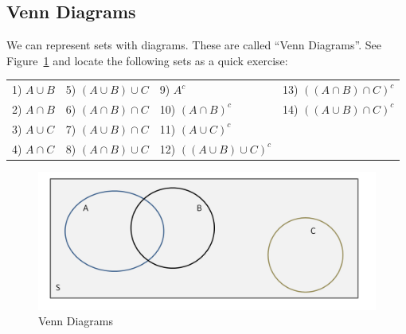 \documentclass[11pt]{article}
\begin{document}
\subsection*{Venn Diagrams}
 We can represent sets with diagrams. These are called ``Venn Diagrams''. See Figure~\ref{f1} and locate the following sets as a quick exercise:\\

\begin{tabular}{llll}
	1) $A \cup B$ & 5) $(A \cup B) \cup C$ & 9) $A^c$ & 13) $((A \cap B) \cap C)^c$\\
	2) $A \cap B$ & 6) $(A \cap B) \cap C$ & 10) $(A \cap B)^c$ & 14) $((A \cup B) \cap C)^c$\\
	3) $A \cup C$ & 7) $(A \cup B) \cap C$ & 11) $(A \cup C)^c$ &\\
	4) $A \cap C$ & 8) $(A \cap B) \cup C$ & 12) $((A \cup B) \cup C)^c$ &\\
\end{tabular}

\begin{figure}[htp]
\centering
\includegraphics[scale=0.40]{venn.png}
\caption{Venn Diagrams}
\label{f1}
\end{figure}
\end{document}
